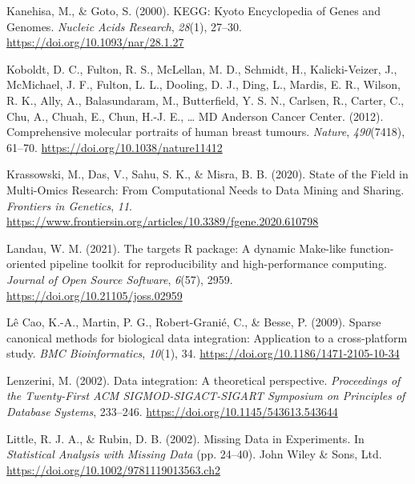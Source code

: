 \documentclass[a4paper, nobind]{templates/ociamthesis}
\newlength{\cslhangindent}
\newenvironment{CSLReferences}[2] %
 {%
  \setlength{\parindent}{0pt}
  \ifodd #1
  \let\oldpar\par
  \def\par{\hangindent=\cslhangindent\oldpar}
  \fi
  \setlength{\parskip}{1mm}
  \setlength{\baselineskip}{6mm}
 }%
 {}
\begin{document}
\begin{CSLReferences}{1}{0}
\leavevmode{}%
Kanehisa, M., \& Goto, S. (2000). {KEGG}: {Kyoto} {Encyclopedia} of {Genes} and {Genomes}. \emph{Nucleic Acids Research}, \emph{28}(1), 27--30. \url{https://doi.org/10.1093/nar/28.1.27}

\leavevmode{}%
Koboldt, D. C., Fulton, R. S., McLellan, M. D., Schmidt, H., Kalicki-Veizer, J., McMichael, J. F., Fulton, L. L., Dooling, D. J., Ding, L., Mardis, E. R., Wilson, R. K., Ally, A., Balasundaram, M., Butterfield, Y. S. N., Carlsen, R., Carter, C., Chu, A., Chuah, E., Chun, H.-J. E., \ldots{} MD Anderson Cancer Center. (2012). Comprehensive molecular portraits of human breast tumours. \emph{Nature}, \emph{490}(7418), 61--70. \url{https://doi.org/10.1038/nature11412}

\leavevmode{}%
Krassowski, M., Das, V., Sahu, S. K., \& Misra, B. B. (2020). State of the {Field} in {Multi}-{Omics} {Research}: {From} {Computational} {Needs} to {Data} {Mining} and {Sharing}. \emph{Frontiers in Genetics}, \emph{11}. \url{https://www.frontiersin.org/articles/10.3389/fgene.2020.610798}

\leavevmode{}%
Landau, W. M. (2021). The targets {R} package: A dynamic {Make}-like function-oriented pipeline toolkit for reproducibility and high-performance computing. \emph{Journal of Open Source Software}, \emph{6}(57), 2959. \url{https://doi.org/10.21105/joss.02959}

\leavevmode{}%
Lê Cao, K.-A., Martin, P. G., Robert-Granié, C., \& Besse, P. (2009). Sparse canonical methods for biological data integration: Application to a cross-platform study. \emph{BMC Bioinformatics}, \emph{10}(1), 34. \url{https://doi.org/10.1186/1471-2105-10-34}

\leavevmode{}%
Lenzerini, M. (2002). Data integration: A theoretical perspective. \emph{Proceedings of the Twenty-First {ACM} {SIGMOD}-{SIGACT}-{SIGART} Symposium on {Principles} of Database Systems}, 233--246. \url{https://doi.org/10.1145/543613.543644}

\leavevmode{}%
Little, R. J. A., \& Rubin, D. B. (2002). Missing {Data} in {Experiments}. In \emph{Statistical {Analysis} with {Missing} {Data}} (pp. 24--40). John Wiley \& Sons, Ltd. \url{https://doi.org/10.1002/9781119013563.ch2}


\end{CSLReferences}
\end{document}
